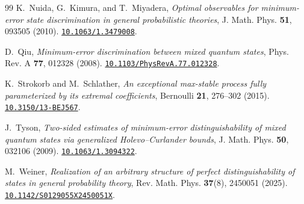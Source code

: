 \documentclass[a4paper,11pt,onecolumn,unpublished]{quantumarticle}
\theoremstyle{definition}
\newcommand{\1}{\mathbf 1}
\newcommand{\doi}[1]{\href{https://doi.org/#1}{\nolinkurl{#1}}}
\begin{document}
\begin{thebibliography}{99}
K.~Nuida, G.~Kimura, and T.~Miyadera,
\emph{Optimal observables for minimum-error state discrimination in general
probabilistic theories}, J. Math. Phys. \textbf{51}, 093505 (2010).
\doi{10.1063/1.3479008}.

D.~Qiu, \emph{Minimum-error discrimination between mixed quantum states},
Phys. Rev. A \textbf{77}, 012328 (2008).
\doi{10.1103/PhysRevA.77.012328}.

K.~Strokorb and M.~Schlather,
\emph{An exceptional max-stable process fully parameterized by its extremal
coefficients}, Bernoulli \textbf{21}, 276--302 (2015).
\doi{10.3150/13-BEJ567}.

J.~Tyson, \emph{Two-sided estimates of minimum-error distinguishability of
mixed quantum states via generalized Holevo--Curlander bounds},
J. Math. Phys. \textbf{50}, 032106 (2009).
\doi{10.1063/1.3094322}.

M.~Weiner, \emph{Realization of an arbitrary structure of perfect
distinguishability of states in general probability theory},
Rev. Math. Phys. \textbf{37}(8), 2450051 (2025).
\doi{10.1142/S0129055X2450051X}.
\end{thebibliography}
\end{document}
